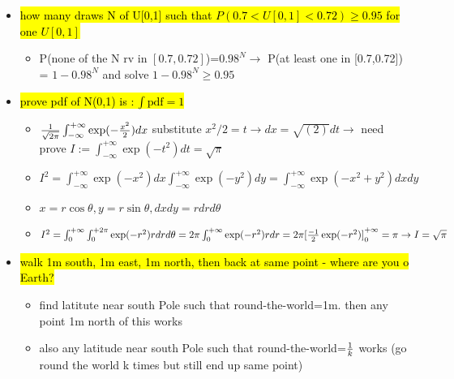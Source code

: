 \documentclass[10pt,landscape,a4paper]{article}
\begin{document}
\begin{multicols*}{4}
\begin{spacing}{0.1}
\begin{itemize}
\item \hl{how many draws N of U[0,1] such that $P(0.7 < U[0,1] < 0.72) \ge 0.95$ for one $U[0,1]$}
\begin{itemize}
\item P(none of the N rv in $[0.7,0.72]$)=${0.98}^N \rightarrow $ P(at least one in [0.7,0.72]) = $1-{0.98}^N$ and solve $1-{0.98}^N \ge 0.95$
\end{itemize}

\item \hl{prove pdf of N(0,1) is $: \int \text{pdf}=1$}
\begin{itemize}
\item $\frac{1}{\sqrt{2\pi}} \int_{-\infty}^{+\infty} \exp(-{x^2 \over 2}) dx$ substitute $x^2/2 = t \rightarrow dx = \sqrt{(2)}dt \rightarrow $ need prove $ I := \int_{-\infty}^{+\infty} \exp(-{t^2}) dt = \sqrt{\pi } $

\item $I^2=\int_{-\infty}^{+\infty} \exp(-{x^2}) dx \int_{-\infty}^{+\infty} \exp(-{y^2}) dy = \int_{-\infty}^{+\infty} \exp(-{x^2+y^2}) dx dy $
\item $x=r\cos \theta , y = r \sin \theta , dxdy = rdrd\theta$
\item $I^2=\int_{0}^{+\infty}\int_{0}^{+2\pi} \exp(-r^2)rdrd\theta = 2\pi\int_{0}^{+\infty} \exp(-r^2)rdr = 2\pi {[{-1 \over 2}\exp(-r^2)]}_0^{+\infty}=\pi \rightarrow I= \sqrt{\pi} $
\end{itemize}

\item \hl{walk 1m south, 1m east, 1m north, then back at same point - where are you o Earth?}
\begin{itemize}
\item find latitute near south Pole such that round-the-world=1m. then any point 1m north of this works
\item also any latitude near south Pole such that round-the-world=$1\over k$ works (go round the world k times but still end up same point)
\end{itemize}


\end{itemize}
\end{spacing}
\end{multicols*}
\end{document}
